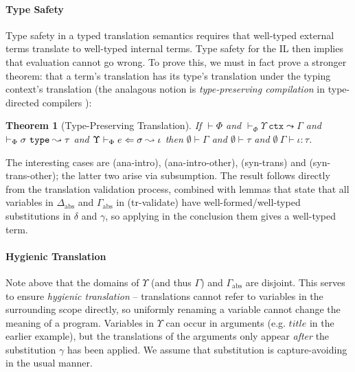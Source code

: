 \documentclass[pldi]{sigplanconf-pldi15}
\newtheorem{theorem}{Theorem}
\newenvironment{proof-sketch}{\noindent{\emph{Proof Sketch.}}}{\qed}
\begin{document}
\paragraph{Type Safety}
Type safety in a typed translation semantics requires that well-typed external terms translate to well-typed internal terms. Type safety for the IL \cite{pfpl} then implies that evaluation cannot go wrong. To prove this, we must in fact prove a stronger theorem: that a term's translation has its type's translation under the typing context's translation (the analagous notion is \emph{type-preserving compilation} in type-directed compilers \cite{tarditi+:til-OLD}):%

\vspace{-4px}\begin{theorem}[Type-Preserving Translation]
\label{thm:type-preserving-translation}
If $\vdash \Phi$ and $\vdash_\Phi \Upsilon~\mathtt{ctx} \leadsto \Gamma$ and $\vdash_\Phi \sigma~\mathtt{type} \leadsto \tau$ and $\Upsilon \vdash_{\Phi} e \Leftarrow \sigma \leadsto \iota$ then $\emptyset \vdash \Gamma$ and $\emptyset \vdash \tau$ and $\emptyset~\Gamma \vdash \iota : \tau$.
\end{theorem}
\begin{proof-sketch}
The interesting cases are (ana-intro), (ana-intro-other), (syn-trans) and (syn-trans-other); the latter two arise via subsumption. The result follows directly from the translation validation process, combined with lemmas that state that all variables in $\Delta_\text{abs}$ and $\Gamma_\text{abs}$ in (tr-validate) have well-formed/well-typed substitutions in $\delta$ and $\gamma$,  so applying in the conclusion them gives a well-typed term.
\end{proof-sketch}

\paragraph{Hygienic Translation} 
Note above that the domains of $\Upsilon$ (and thus $\Gamma$)  and $\Gamma_\text{abs}$ are disjoint. This serves to ensure \emph{hygienic translation} -- translations cannot refer to variables in the surrounding scope directly, so uniformly renaming a variable cannot change the meaning of a program. Variables in $\Upsilon$ can  occur in arguments (e.g. $title$ in the earlier example), but the translations of the arguments only appear \emph{after} the substitution $\gamma$ has been applied. We assume that substitution is capture-avoiding in the usual manner. %
\end{document}

